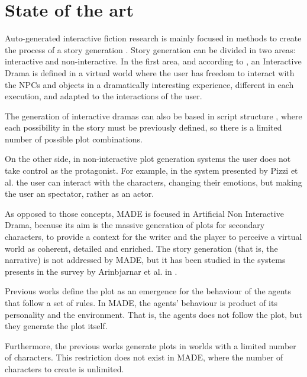 \documentclass[runningheads]{llncs}
\begin{document}
\section{State of the art}
\label{sec:soa}


Auto-generated interactive fiction research is mainly focused in methods to create the process of a story generation \cite{nairat2011character}. Story generation can be divided in two areas: interactive and non-interactive. In the first area, and according to \cite{ReviewArinbjarnar09}, an Interactive Drama is defined in a virtual world where the user has freedom to interact with the NPCs and objects in a dramatically interesting experience, different in each execution, and adapted to the interactions of the user.

The generation of interactive dramas can also be based in script
structure \cite{ArchitectureYoung04}, where each possibility in the
story must be previously defined, so there is a limited number of
possible plot combinations.

On the other side, in non-interactive plot generation systems the user does not take control as the protagonist. For example, in the system presented by Pizzi et al. \cite{pizzi2007interactive} the user can interact with the characters, changing their emotions, but making the user an spectator, rather as an actor.

As opposed to those concepts, MADE is focused in Artificial Non Interactive Drama, because its aim is the massive generation of plots for secondary characters, to provide a context for the writer and the player to perceive a virtual world as coherent, detailed and enriched. The story generation (that is, the narrative) is not addressed by MADE, but it has been studied in the systems presents in the survey by Arinbjarnar et al. in \cite{ReviewArinbjarnar09}.


Previous works define the plot as an emergence for the behaviour of the agents that follow a set of rules. In MADE, the agents' behaviour is product of its personality and the environment. That is, the agents does not follow the plot, but they generate the plot itself. 


Furthermore, the previous works generate plots in worlds with a limited number of characters. This restriction does not exist in MADE, where the number of characters to create is unlimited.
\end{document}
